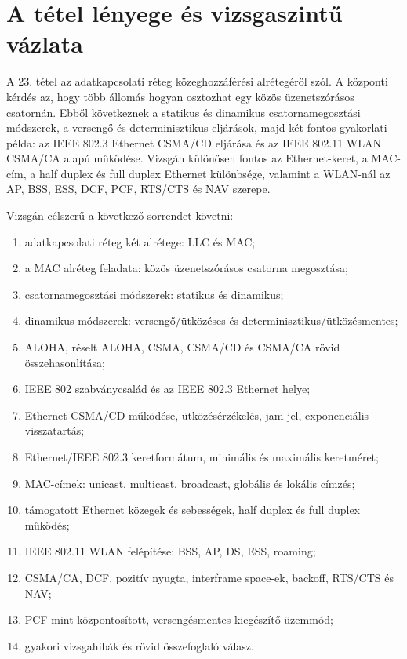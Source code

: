 \section{A tétel lényege és vizsgaszintű vázlata}

\begin{summarybox}
A 23. tétel az adatkapcsolati réteg közeghozzáférési alrétegéről szól. A központi kérdés az, hogy több állomás hogyan osztozhat egy közös üzenetszórásos csatornán. Ebből következnek a statikus és dinamikus csatornamegosztási módszerek, a versengő és determinisztikus eljárások, majd két fontos gyakorlati példa: az IEEE 802.3 Ethernet CSMA/CD eljárása és az IEEE 802.11 WLAN CSMA/CA alapú működése. Vizsgán különösen fontos az Ethernet-keret, a MAC-cím, a half duplex és full duplex Ethernet különbsége, valamint a WLAN-nál az AP, BSS, ESS, DCF, PCF, RTS/CTS és NAV szerepe.
\end{summarybox}

Vizsgán célszerű a következő sorrendet követni:

\begin{enumerate}
  \item adatkapcsolati réteg két alrétege: LLC és MAC;
  \item a MAC alréteg feladata: közös üzenetszórásos csatorna megosztása;
  \item csatornamegosztási módszerek: statikus és dinamikus;
  \item dinamikus módszerek: versengő/ütközéses és determinisztikus/ütközésmentes;
  \item ALOHA, réselt ALOHA, CSMA, CSMA/CD és CSMA/CA rövid összehasonlítása;
  \item IEEE 802 szabványcsalád és az IEEE 802.3 Ethernet helye;
  \item Ethernet CSMA/CD működése, ütközésérzékelés, jam jel, exponenciális visszatartás;
  \item Ethernet/IEEE 802.3 keretformátum, minimális és maximális keretméret;
  \item MAC-címek: unicast, multicast, broadcast, globális és lokális címzés;
  \item támogatott Ethernet közegek és sebességek, half duplex és full duplex működés;
  \item IEEE 802.11 WLAN felépítése: BSS, AP, DS, ESS, roaming;
  \item CSMA/CA, DCF, pozitív nyugta, interframe space-ek, backoff, RTS/CTS és NAV;
  \item PCF mint központosított, versengésmentes kiegészítő üzemmód;
  \item gyakori vizsgahibák és rövid összefoglaló válasz.
\end{enumerate}

